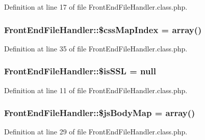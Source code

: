 Definition at line 17 of file Front\+End\+File\+Handler.\+class.\+php.

\subsubsection[{\texorpdfstring{\$css\+Map\+Index}{$cssMapIndex}}]{\setlength{\rightskip}{0pt plus 5cm}Front\+End\+File\+Handler\+::\$css\+Map\+Index = array()}\hypertarget{classFrontEndFileHandler_a61df1d725cd1884fd0a260dec738a4b7}{}\label{classFrontEndFileHandler_a61df1d725cd1884fd0a260dec738a4b7}


Definition at line 35 of file Front\+End\+File\+Handler.\+class.\+php.

\subsubsection[{\texorpdfstring{\$is\+S\+SL}{$isSSL}}]{\setlength{\rightskip}{0pt plus 5cm}Front\+End\+File\+Handler\+::\$is\+S\+SL = {\bf null}\hspace{0.3cm}{\ttfamily [static]}}\hypertarget{classFrontEndFileHandler_a1e709934ab4023d10850268064d771bc}{}\label{classFrontEndFileHandler_a1e709934ab4023d10850268064d771bc}


Definition at line 11 of file Front\+End\+File\+Handler.\+class.\+php.

\subsubsection[{\texorpdfstring{\$js\+Body\+Map}{$jsBodyMap}}]{\setlength{\rightskip}{0pt plus 5cm}Front\+End\+File\+Handler\+::\$js\+Body\+Map = array()}\hypertarget{classFrontEndFileHandler_ad03de614a088bc386c393543a3cd9aed}{}\label{classFrontEndFileHandler_ad03de614a088bc386c393543a3cd9aed}


Definition at line 29 of file Front\+End\+File\+Handler.\+class.\+php.


